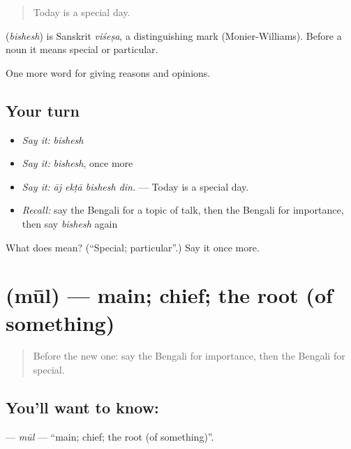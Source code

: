 \begin{quote}
Today is a special day.
\end{quote}

\begin{cousinweb}
\textbf{} (\emph{bishesh}) is Sanskrit \emph{viśeṣa}, a distinguishing mark (Monier-Williams). Before a noun it means special or particular.
\end{cousinweb}

\begin{grammarlens}[title={What you've built}]
One more word for giving reasons and opinions.
\end{grammarlens}

\subsection*{Your turn}
\begin{itemize}
\raggedright
  \item \emph{Say it:} \emph{bishesh}
  \item \emph{Say it:} \emph{bishesh}, once more
  \item \emph{Say it:} \emph{āj ekṭā bishesh din.} — Today is a special day.
  \item \emph{Recall:} say the Bengali for a topic of talk, then the Bengali for importance, then say \emph{bishesh} again
\end{itemize}

\begin{tcolorbox}[breakable,colback=teal!4,colframe=teal!35!black,title={Before you move on}]
What does  mean? (\textquotedblleft{}Special; particular\textquotedblright{}.) Say it once more.
\end{tcolorbox}
\section[\texorpdfstring{\bn{মূল} (mūl)}{মূল (mūl)}]{ (mūl) — main; chief; the root (of something)}

\label{lesson:BN-C336-mul}



\begin{quote}
Before the new one: say the Bengali for importance, then the Bengali for special.
\end{quote}

\subsection*{You'll want to know: }
\textbf{} — \emph{mūl} — \textquotedblleft{}main; chief; the root (of something)\textquotedblright{}.

